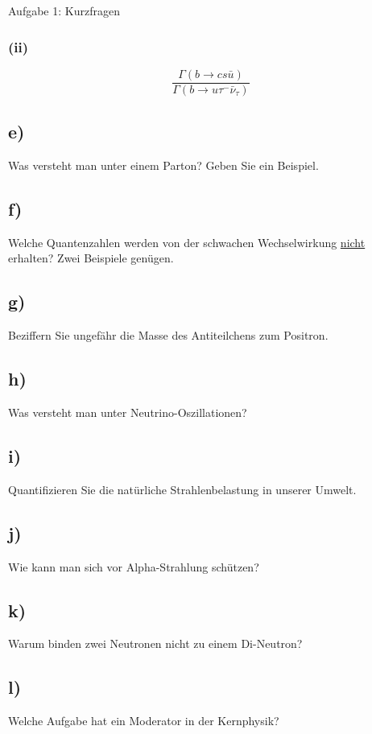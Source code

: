 \begin{aufgabe}{Aufgabe 1: Kurzfragen}
    \subsubsection{(ii)}
    \[
        \frac{\Gamma(b \to cs\bar u)}{{\Gamma(b \to u \tau^-\bar\nu_\tau)}}
    \]

    \subsection{e)}
    Was versteht man unter einem Parton?
    Geben Sie ein Beispiel.

    \subsection{f)}
    Welche Quantenzahlen werden von der schwachen Wechselwirkung \underline{nicht} erhalten?
    Zwei Beispiele genügen.

    \subsection{g)}
    Beziffern Sie ungefähr die Masse des Antiteilchens zum Positron.

    \subsection{h)}
    Was versteht man unter Neutrino-Oszillationen?

    \subsection{i)}
    Quantifizieren Sie die natürliche Strahlenbelastung in unserer Umwelt.

    \subsection{j)}
    Wie kann man sich vor Alpha-Strahlung schützen?

    \subsection{k)}
    Warum binden zwei Neutronen nicht zu einem Di-Neutron?

    \subsection{l)}
    Welche Aufgabe hat ein Moderator in der Kernphysik?


\end{aufgabe}
